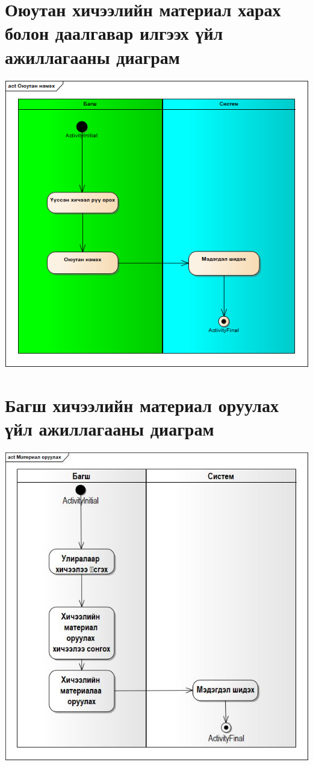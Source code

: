 \documentclass[12pt]{article}
\begin{document}
	\section{Оюутан хичээлийн материал харах болон даалгавар илгээх үйл ажиллагааны диаграм}
		\includegraphics[scale=0.8]{activity}
	
	\section{Багш хичээлийн материал оруулах үйл ажиллагааны диаграм}
		\includegraphics[scale=0.8]{activity1}
		
\end{document}
